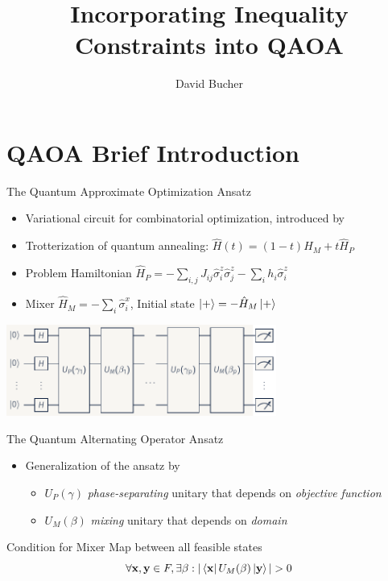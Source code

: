 \documentclass[aspectratio=169]{beamer}
\author{David Bucher}
\title{Incorporating Inequality Constraints into QAOA}
\begin{document}
\maketitle

\section{QAOA Brief Introduction}


\begin{frame}{The Quantum Approximate Optimization Ansatz}
\begin{center}
    \begin{itemize}
        \item Variational circuit for combinatorial optimization, introduced
            by~\citeauthor{farhi2014}~\cite{farhi2014}
        \item Trotterization of quantum annealing: $\hat H(t) = (1-t) \hat H_M +
            t \hat H_P$
        \item Problem Hamiltonian $\hat H_P = -\sum_{i,j} J_{ij} \hat \sigma^z_i
            \hat \sigma_j^z - \sum_i h_i \hat \sigma_i^z$
        \item Mixer $\hat H_M = -\sum_{i} \hat\sigma^x_i$, Initial state $\ket{+} = -\hat H_M \ket{+}$
    \end{itemize}
    \vspace{6pt}
    \includegraphics[height=3.0cm]{graphics/build/qaoa.pdf}
\end{center}
\end{frame}

\begin{frame}{The Quantum Alternating Operator Ansatz}
    \begin{itemize}
        \item Generalization of the ansatz by~\citeauthor{hadfield2019}~\cite{hadfield2019}
        \begin{itemize}
            \item $U_P(\gamma)$ \emph{phase-separating} unitary that depends on
                \emph{objective function}
            \item $U_M(\beta)$ \emph{mixing} unitary that depends on
                \emph{domain}
        \end{itemize}
    \end{itemize}
        \begin{block}{Condition for Mixer}
            Map between all feasible states
        \[
            \forall \mathbf{x}, \mathbf{y} \in F,  \exists \beta :
            |\bra{\mathbf{x}}
            U_M(\beta)  \ket{\mathbf{y}}| > 0
        \]
        \end{block}
\end{frame}
\end{document}
